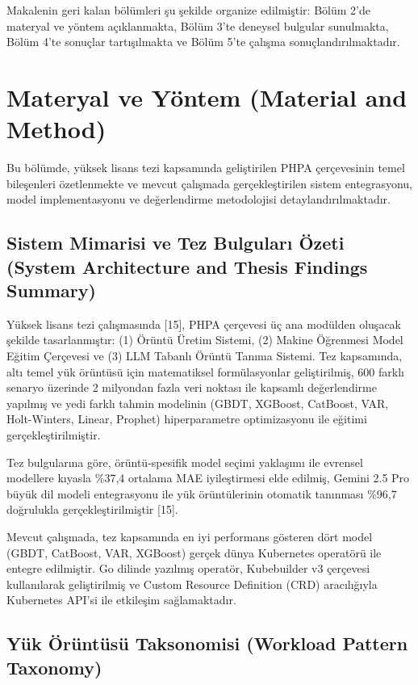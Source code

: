 \documentclass[12pt,a4paper]{article}
\begin{document}
Makalenin geri kalan bölümleri şu şekilde organize edilmiştir: Bölüm 2'de materyal ve yöntem açıklanmakta, Bölüm 3'te deneysel bulgular sunulmakta, Bölüm 4'te sonuçlar tartışılmakta ve Bölüm 5'te çalışma sonuçlandırılmaktadır.

\section{Materyal ve Yöntem (Material and Method)}

Bu bölümde, yüksek lisans tezi kapsamında geliştirilen PHPA çerçevesinin temel bileşenleri özetlenmekte ve mevcut çalışmada gerçekleştirilen sistem entegrasyonu, model implementasyonu ve değerlendirme metodolojisi detaylandırılmaktadır.

\subsection{Sistem Mimarisi ve Tez Bulguları Özeti (System Architecture and Thesis Findings Summary)}

Yüksek lisans tezi çalışmasında [15], PHPA çerçevesi üç ana modülden oluşacak şekilde tasarlanmıştır: (1) Örüntü Üretim Sistemi, (2) Makine Öğrenmesi Model Eğitim Çerçevesi ve (3) LLM Tabanlı Örüntü Tanıma Sistemi. Tez kapsamında, altı temel yük örüntüsü için matematiksel formülasyonlar geliştirilmiş, 600 farklı senaryo üzerinde 2 milyondan fazla veri noktası ile kapsamlı değerlendirme yapılmış ve yedi farklı tahmin modelinin (GBDT, XGBoost, CatBoost, VAR, Holt-Winters, Linear, Prophet) hiperparametre optimizasyonu ile eğitimi gerçekleştirilmiştir.

Tez bulgularına göre, örüntü-spesifik model seçimi yaklaşımı ile evrensel modellere kıyasla \%37,4 ortalama MAE iyileştirmesi elde edilmiş, Gemini 2.5 Pro büyük dil modeli entegrasyonu ile yük örüntülerinin otomatik tanınması \%96,7 doğrulukla gerçekleştirilmiştir [15].

Mevcut çalışmada, tez kapsamında en iyi performans gösteren dört model (GBDT, CatBoost, VAR, XGBoost) gerçek dünya Kubernetes operatörü ile entegre edilmiştir. Go dilinde yazılmış operatör, Kubebuilder v3 çerçevesi kullanılarak geliştirilmiş ve Custom Resource Definition (CRD) aracılığıyla Kubernetes API'si ile etkileşim sağlamaktadır.

\subsection{Yük Örüntüsü Taksonomisi (Workload Pattern Taxonomy)}
\end{document}
